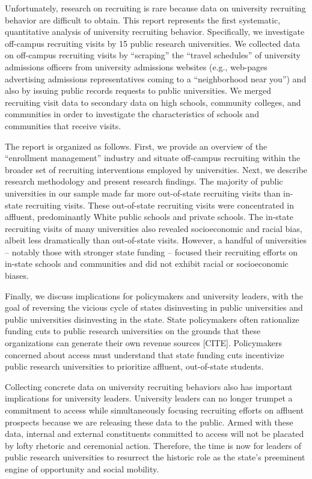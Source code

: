 \documentclass[twoside]{article}
\begin{document}
Unfortunately, research on recruiting is rare because data on university recruiting behavior are difficult to obtain.  This report represents the first systematic, quantitative analysis of university recruiting behavior. Specifically, we investigate off-campus recruiting visits by 15 public research universities.  We collected data on off-campus recruiting visits by ``scraping'' the ``travel schedules'' of university admissions officers from university admissions websites (e.g., web-pages advertising admissions representatives coming to a ``neighborhood near you'') and also by issuing public records requests to public universities.  We merged recruiting visit data to secondary data on high schools, community colleges, and communities in order to investigate the characteristics of schools and communities that receive visits.  

The report is organized as follows. First, we provide an overview of the ``enrollment management'' industry and situate off-campus recruiting within the broader set of recruiting interventions employed by universities.  Next, we describe research methodology and present research findings.  The majority of public universities in our sample made far more out-of-state recruiting visits than in-state recruiting visits.  These out-of-state recruiting visits were concentrated in affluent, predominantly White public schools and private schools.  The in-state recruiting visits of many universities also revealed socioeconomic and racial bias, albeit less dramatically than out-of-state visits.  However, a handful of universities -- notably those with stronger state funding -- focused their recruiting efforts on in-state schools and communities and did not exhibit racial or socioeconomic biases.  

Finally, we discuss implications for policymakers and university leaders, with the goal of reversing the vicious cycle of states disinvesting in public universities and public universities disinvesting in the state.  State policymakers often rationalize funding cuts to public research universities on the grounds that these organizations can generate their own revenue sources [CITE].  Policymakers concerned about access must understand that state funding cuts incentivize public research universities to prioritize affluent, out-of-state students. 

Collecting concrete data on university recruiting behaviors also has important implications for university leaders. University leaders can no longer trumpet a commitment to access while simultaneously focusing recruiting efforts on affluent prospects because we are releasing these data to the public. Armed with these data, internal and external constituents committed to access will not be placated by lofty rhetoric and ceremonial action.  Therefore, the time is now for leaders of public research universities to resurrect the historic role as the state's preeminent engine of opportunity and social mobility.
\end{document}
